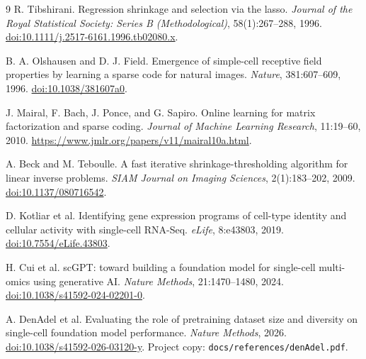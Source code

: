 \documentclass[11pt]{article}
\begin{document}
\begin{thebibliography}{9}
R. Tibshirani.
Regression shrinkage and selection via the lasso.
\emph{Journal of the Royal Statistical Society: Series B (Methodological)}, 58(1):267--288, 1996.
\href{https://doi.org/10.1111/j.2517-6161.1996.tb02080.x}{doi:10.1111/j.2517-6161.1996.tb02080.x}.

B. A. Olshausen and D. J. Field.
Emergence of simple-cell receptive field properties by learning a sparse code for natural images.
\emph{Nature}, 381:607--609, 1996.
\href{https://doi.org/10.1038/381607a0}{doi:10.1038/381607a0}.

J. Mairal, F. Bach, J. Ponce, and G. Sapiro.
Online learning for matrix factorization and sparse coding.
\emph{Journal of Machine Learning Research}, 11:19--60, 2010.
\url{https://www.jmlr.org/papers/v11/mairal10a.html}.

A. Beck and M. Teboulle.
A fast iterative shrinkage-thresholding algorithm for linear inverse problems.
\emph{SIAM Journal on Imaging Sciences}, 2(1):183--202, 2009.
\href{https://doi.org/10.1137/080716542}{doi:10.1137/080716542}.

D. Kotliar et al.
Identifying gene expression programs of cell-type identity and cellular activity with single-cell RNA-Seq.
\emph{eLife}, 8:e43803, 2019.
\href{https://doi.org/10.7554/eLife.43803}{doi:10.7554/eLife.43803}.

H. Cui et al.
scGPT: toward building a foundation model for single-cell multi-omics using generative AI.
\emph{Nature Methods}, 21:1470--1480, 2024.
\href{https://doi.org/10.1038/s41592-024-02201-0}{doi:10.1038/s41592-024-02201-0}.

A. DenAdel et al.
Evaluating the role of pretraining dataset size and diversity on single-cell foundation model performance.
\emph{Nature Methods}, 2026.
\href{https://doi.org/10.1038/s41592-026-03120-y}{doi:10.1038/s41592-026-03120-y}.
Project copy: \texttt{docs/references/denAdel.pdf}.
\end{thebibliography}
\end{document}
